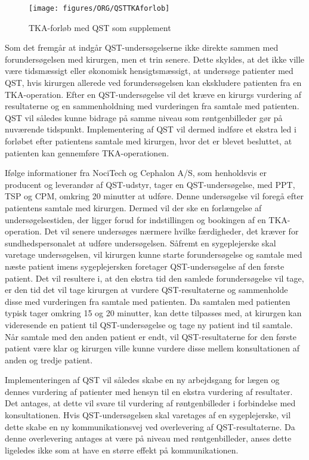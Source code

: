 \begin{figure}[H]
	\caption{TKA-forløb med QST som supplement}
	\centering
	\texttt{[image: figures/ORG/QSTTKAforlob]}
	\label{fig:QSTKAforlob}
	\flushleft
\end{figure}


Som det fremgår at  indgår QST-undersøgelserne ikke direkte sammen med forundersøgelsen med kirurgen, men et trin senere. Dette skyldes, at det ikke ville være tidsmæssigt eller økonomisk hensigtsmæssigt, at undersøge patienter med QST, hvis kirurgen allerede ved forundersøgelsen kan ekskludere patienten fra en TKA-operation. Efter en QST-undersøgelse vil det kræve en kirurgs vurdering af resultaterne og en sammenholdning med vurderingen fra samtale med patienten. QST vil således kunne bidrage på samme niveau som røntgenbilleder gør på nuværende tidspunkt. Implementering af QST vil dermed indføre et ekstra led i forløbet efter patientens samtale med kirurgen, hvor det er blevet besluttet, at patienten kan gennemføre TKA-operationen. 

Ifølge informationer fra NociTech og Cephalon A/S, som henholdsvis er producent og leverandør af QST-udstyr, tager en QST-undersøgelse, med PPT, TSP og CPM, omkring 20 minutter at udføre. Denne undersøgelse vil foregå efter patientens samtale med kirurgen. Dermed vil der ske en forlængelse af undersøgelsestiden, der ligger forud for indstillingen og bookingen af en TKA-operation.  Det vil senere undersøges nærmere hvilke færdigheder, det kræver for sundhedspersonalet at udføre undersøgelsen. Såfremt en sygeplejerske skal varetage undersøgelsen, vil kirurgen kunne starte forundersøgelse og samtale med næste patient imens sygeplejersken foretager QST-undersøgelse af den første patient. Det vil resultere i, at den ekstra tid den samlede forundersøgelse vil tage, er den tid det vil tage kirurgen at vurdere QST-resultaterne og sammenholde disse med vurderingen fra samtale med patienten. Da samtalen med patienten typisk tager omkring 15 og 20 minutter,  kan dette tilpasses med, at kirurgen kan videresende en patient til QST-undersøgelse og tage ny patient ind til samtale. Når samtale med den anden patient er endt, vil QST-resultaterne for den første patient være klar og kirurgen ville kunne vurdere disse mellem konsultationen af anden og tredje patient.

Implementeringen af QST vil således skabe en ny arbejdsgang for lægen og dennes vurdering af patienter med hensyn til en ekstra vurdering af resultater. Det antages, at dette vil svare til vurdering af røntgenbilleder i forbindelse med konsultationen.
Hvis QST-undersøgelsen skal varetages af en sygeplejerske, vil dette skabe en ny kommunikationsvej ved overlevering af QST-resultaterne. Da denne overlevering antages at være på niveau med røntgenbilleder, anses dette ligeledes ikke som at have en større effekt på kommunikationen. 


